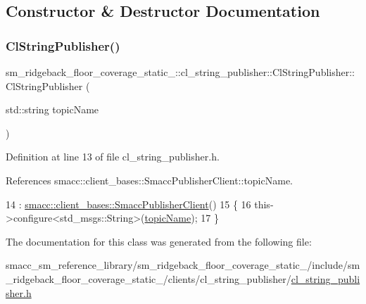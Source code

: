 \subsection{Constructor \& Destructor Documentation}
\mbox{\label{classsm__ridgeback__floor__coverage__static__1_1_1cl__string__publisher_1_1ClStringPublisher_a6a83d7ed59446dea2e0ec9db46e18138}} 
\subsubsection{\texorpdfstring{Cl\+String\+Publisher()}{ClStringPublisher()}}
{\footnotesize\ttfamily sm\+\_\+ridgeback\+\_\+floor\+\_\+coverage\+\_\+static\+\_\+::cl\+\_\+string\+\_\+publisher\+::\+Cl\+String\+Publisher\+::\+Cl\+String\+Publisher (\begin{DoxyParamCaption}\item[{std\+::string}]{topic\+Name }\end{DoxyParamCaption})\hspace{0.3cm}{\ttfamily [inline]}}



Definition at line 13 of file cl\+\_\+string\+\_\+publisher.\+h.



References smacc\+::client\+\_\+bases\+::\+Smacc\+Publisher\+Client\+::topic\+Name.


\begin{DoxyCode}
14         : \hyperlink{classsmacc_1_1client__bases_1_1SmaccPublisherClient}{smacc::client\_bases::SmaccPublisherClient}()
15     \{
16         this->configure<std\_msgs::String>(\hyperlink{classsmacc_1_1client__bases_1_1SmaccPublisherClient_a8b8d98aef9b3b3a441005d2cb17b4fcc}{topicName});
17     \}
\end{DoxyCode}


The documentation for this class was generated from the following file\+:\begin{DoxyCompactItemize}
\item 
smacc\+\_\+sm\+\_\+reference\+\_\+library/sm\+\_\+ridgeback\+\_\+floor\+\_\+coverage\+\_\+static\+\_/include/sm\+\_\+ridgeback\+\_\+floor\+\_\+coverage\+\_\+static\+\_/clients/cl\+\_\+string\+\_\+publisher/\hyperlink{sm__ridgeback__floor__coverage__static__1_2include_2sm__ridgeback__floor__coverage__static__1_2cb2febaddf68c38df7b977ac0d59a02b6}{cl\+\_\+string\+\_\+publisher.\+h}\end{DoxyCompactItemize}
